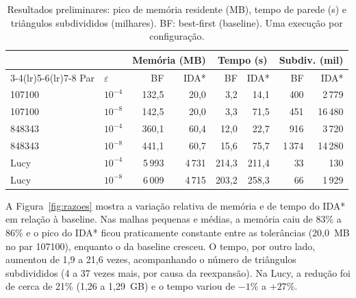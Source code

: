 \documentclass[9pt,a4paper,twocolumn]{extarticle}
\begin{document}
\begin{table}[t]
\caption{Resultados preliminares: pico de memória residente (MB), tempo de parede (s)
e triângulos subdivididos (milhares). BF: best-first (baseline). Uma execução por
configuração.}
\label{tab:preliminar}
\centering
\scriptsize
\setlength{\tabcolsep}{3pt}
\begin{tabular}{llrrrrrr}
\toprule
 & & \multicolumn{2}{c}{Memória (MB)} & \multicolumn{2}{c}{Tempo (s)} & \multicolumn{2}{c}{Subdiv. (mil)} \\
\cmidrule(lr){3-4}\cmidrule(lr){5-6}\cmidrule(lr){7-8}
Par & $\varepsilon$ & BF & IDA* & BF & IDA* & BF & IDA* \\
\midrule
107100 & $10^{-4}$ & 132,5  & 20,0   & 3,2   & 14,1  & 400 & 2\,779 \\
107100 & $10^{-8}$ & 142,5  & 20,0   & 3,3   & 71,5  & 451 & 16\,480 \\
848343 & $10^{-4}$ & 360,1  & 60,4   & 12,0  & 22,7  & 916 & 3\,720 \\
848343 & $10^{-8}$ & 441,1  & 60,7   & 15,6  & 75,7  & 1\,374 & 14\,280 \\
Lucy   & $10^{-4}$ & 5\,993 & 4\,731 & 214,3 & 211,4 & 33  & 130 \\
Lucy   & $10^{-8}$ & 6\,009 & 4\,715 & 203,2 & 258,3 & 66  & 1\,929 \\
\bottomrule
\end{tabular}
\end{table}

A Figura~\ref{fig:razoes} mostra a variação relativa de memória e de tempo do IDA* em
relação à baseline. Nas malhas pequenas e médias, a memória caiu de 83\% a 86\% e o
pico do IDA* ficou praticamente constante entre as tolerâncias (20,0~MB no par
107100), enquanto o da baseline cresceu. O tempo, por outro lado, aumentou de 1,9 a
21,6 vezes, acompanhando o número de triângulos subdivididos (4 a 37 vezes mais, por
causa da reexpansão). Na Lucy, a redução foi de cerca de 21\% (1,26 a 1,29~GB) e o
tempo variou de $-1\%$ a $+27\%$.
\end{document}
